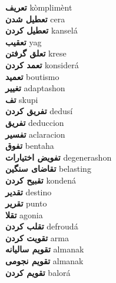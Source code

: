 \textbf{ تعریف  } kòmplimènt \\
\textbf{ تعطیل شدن  } cera \\
\textbf{ تعطیل کردن  } kanselá \\
\textbf{ تعقیب  } yag \\
\textbf{ تعلق گرفتن  } krese \\
\textbf{ تعمد کردن  } konsiderá \\
\textbf{ تعمید  } boutismo \\
\textbf{ تغییر  } adaptashon \\
\textbf{ تف  } skupi \\
\textbf{ تفریق کردن  } dedusí \\
\textbf{ تفریق  } deduccion \\
\textbf{ تفسیر  } aclaracion \\
\textbf{ تفوق  } bentaha \\
\textbf{ تفویض اختیارات  } degenerashon \\
\textbf{ تقاضای سنگین  } belasting \\
\textbf{ تقبیح کردن  } kondená \\
\textbf{ تقدیر  } destino \\
\textbf{ تقریر  } punto \\
\textbf{ تقلا  } agonia \\
\textbf{ تقلب کردن  } defroudá \\
\textbf{ تقویت کردن  } arma \\
\textbf{ تقویم سالیانه  } almanak \\
\textbf{ تقویم نجومی  } almanak \\
\textbf{ تقویم کردن  } balorá \\
